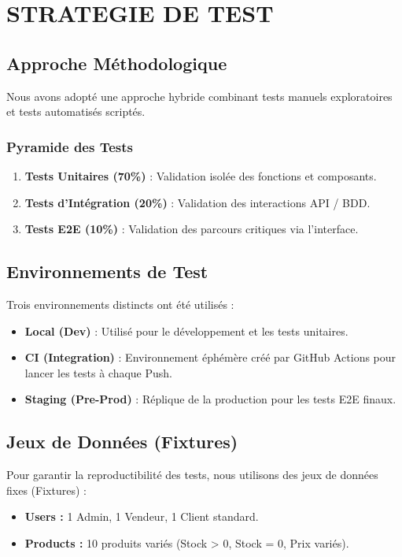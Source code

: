 \documentclass[12pt,a4paper]{article}
\begin{document}
\section{STRATEGIE DE TEST}

\subsection{Approche Méthodologique}
Nous avons adopté une approche hybride combinant tests manuels exploratoires et tests automatisés scriptés.

\subsubsection{Pyramide des Tests}
\begin{enumerate}
    \item \textbf{Tests Unitaires (70\%)} : Validation isolée des fonctions et composants.
    \item \textbf{Tests d'Intégration (20\%)} : Validation des interactions API / BDD.
    \item \textbf{Tests E2E (10\%)} : Validation des parcours critiques via l'interface.
\end{enumerate}

\subsection{Environnements de Test}
Trois environnements distincts ont été utilisés :
\begin{itemize}
    \item \textbf{Local (Dev)} : Utilisé pour le développement et les tests unitaires.
    \item \textbf{CI (Integration)} : Environnement éphémère créé par GitHub Actions pour lancer les tests à chaque Push.
    \item \textbf{Staging (Pre-Prod)} : Réplique de la production pour les tests E2E finaux.
\end{itemize}

\subsection{Jeux de Données (Fixtures)}
Pour garantir la reproductibilité des tests, nous utilisons des jeux de données fixes (Fixtures) :
\begin{itemize}
    \item \textbf{Users :} 1 Admin, 1 Vendeur, 1 Client standard.
    \item \textbf{Products :} 10 produits variés (Stock > 0, Stock = 0, Prix variés).
\end{itemize}
\end{document}
